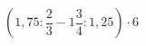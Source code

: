 \begin{ex}[type=calculate]
	\begin{condition}
		\( \left( 1,75:\dfrac{2}{3}-1\dfrac{3}{4}:1,25 \right)\cdot6 \)
	\end{condition}
	\answer{}
\end{ex}